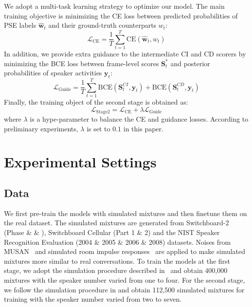 \documentclass{article}
\begin{document}
We adopt a multi-task learning strategy to optimize our model.
The main training objective is minimizing the CE loss between predicted probabilities of PSE labels $\hat{\mathbf{w}}_t$ and their ground-truth counterparts $w_t$:
\begin{equation}
	\mathcal{L}_{\text{CE}} = \frac{1}{T}\sum_{t=1}^{T}{\text{CE}\left(\hat{\mathbf{w}}_t, w_t\right)}
\end{equation}
In addition, we provide extra guidance to the intermediate CI and CD scorers by minimizing the BCE loss between frame-level scores $\mathbf{S}^{*}_{t}$ and posterior probabilities of speaker activities $\mathbf{y}_{t}$:
\begin{equation}
    \mathcal{L}_{\text{Guide}}=\frac{1}{T}\sum_{t=1}^{T}{\text{BCE}\left(\mathbf{S}^{CI}_{t},\mathbf{y}_{t}\right)+\text{BCE}\left(\mathbf{S}^{CD}_{t},\mathbf{y}_{t}\right)}
\end{equation}
Finally, the training object of the second stage is obtained as:
\begin{equation}
    \mathcal{L}_{\text{Stage2}}=\mathcal{L}_{\text{CE}} + \lambda\mathcal{L}_{\text{Guide}}
\end{equation}
where $\lambda$ is a hype-parameter to balance the CE and guidance losses. According to preliminary experiments, $\lambda$ is set to $0.1$ in this paper.






\section{Experimental Settings}
\subsection{Data}
We first pre-train the models with simulated mixtures and then finetune them on the real dataset.
The simulated mixtures are generated from Switchboard-2 (Phase \uppercase\expandafter{} \& \uppercase\expandafter{} \& \uppercase\expandafter{}), Switchboard Cellular (Part 1 \& 2) and the NIST Speaker Recognition Evaluation (2004 \& 2005 \& 2006 \& 2008) datasets. Noises from MUSAN~\cite{musan} and simulated room impulse responses~\cite{rirs} are applied to make simulated mixtures more similar to real conversations. To train the models at the first stage, we adopt the simulation procedure described in~\cite{SA_EEND} and obtain 400,000 mixtures with the speaker number varied from one to four.
For the second stage, we follow the simulation procedure in \cite{EAND} and obtain 112,500 simulated mixtures for training with the speaker number varied from two to seven.
\end{document}
